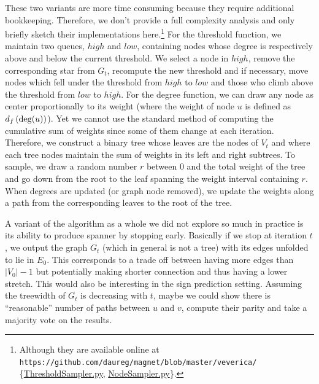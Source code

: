 These two variants are more time consuming because they require additional bookkeeping.
Therefore, we don't provide a full complexity analysis and only briefly sketch their implementations
here.\footnote{Although they are available online at
\nolinkurl{https://github.com/daureg/magnet/blob/master/veverica/}%
\{\href{https://github.com/daureg/magnet/blob/master/veverica/ThresholdSampler.py}%
{ThresholdSampler.py}, \href{https://github.com/daureg/magnet/blob/master/veverica/NodeSampler.py}%
{NodeSampler.py}\}.} For the threshold function, we
maintain two queues, $high$ and $low$, containing nodes whose degree is respectively above and below
the current threshold. We select a node \uar{} in $high$, remove the corresponding star from $G_t$,
recompute the new threshold and if necessary, move nodes which fell under the threshold from $high$
to $low$ and those who climb above the threshold from $low$ to $high$. For the degree function, we
can draw any node as center proportionally to its weight (where the weight of node $u$ is defined as
$d_f\left(\operatorname{deg}(u)\right)$). Yet we cannot use the standard method of computing the cumulative sum
of weights since some of them change at each iteration. Therefore, we construct a binary tree whose
leaves are the nodes of $V_t$ and where each tree nodes maintain the sum of weights in its left and
right subtrees. To sample, we draw a random number $r$ between $0$ and the total weight of the tree and
go down from the root to the leaf spanning the weight interval containing $r$.
When degrees are updated (or graph node removed), we update the weights along a path from the
corresponding leaves to the root of the tree.

A variant of the \gtx{} algorithm as a whole we did not explore so much in practice is its ability
to produce spanner by stopping early. Basically if we stop at iteration $t$, we output the graph
$G_t$ (which in general is not a tree) with its edges unfolded to lie in $E_0$. This corresponds to
a trade off between having more edges than $|V_0|-1$ but potentially making shorter connection and
thus having a lower stretch. This would also be interesting in the sign prediction setting. Assuming
the treewidth of $G_t$ is decreasing with $t$, maybe we could show there is \enquote{reasonable}
number of paths between $u$ and $v$, compute their parity and take a majority vote on the results.

